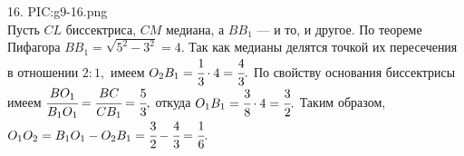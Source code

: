 16. {{PIC:g9-16.png}}\\
Пусть $CL$ биссектриса, $CM$ медиана, а $BB_1$ --- и то, и другое. По теореме Пифагора $BB_1=\sqrt{5^2-3^2}=4.$ Так как медианы делятся точкой их пересечения в отношении $2:1,$ имеем $O_2B_1=\cfrac{1}{3}\cdot4=\cfrac{4}{3}.$ По свойству основания биссектрисы имеем $\cfrac{BO_1}{B_1O_1}=\cfrac{BC}{CB_1}=\cfrac{5}{3},$ откуда $O_1B_1=\cfrac{3}{8}\cdot4=\cfrac{3}{2}.$ Таким образом, $O_1O_2=B_1O_1-O_2B_1=\cfrac{3}{2}-\cfrac{4}{3}=\cfrac{1}{6}.$\\
